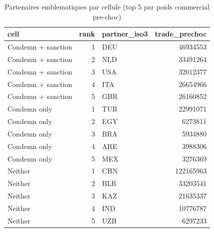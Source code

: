\begin{table}

\caption{Partenaires emblematiques par cellule (top 5 par poids commercial pre-choc)}
\centering
\begin{tabular}[t]{lrlr}
\toprule
cell & rank & partner\_iso3 & trade\_prechoc\\
\midrule
Condemn + sanction & 1 & DEU & 46934553\\
Condemn + sanction & 2 & NLD & 33491264\\
Condemn + sanction & 3 & USA & 32012377\\
Condemn + sanction & 4 & ITA & 26654966\\
Condemn + sanction & 5 & GBR & 26160852\\
Condemn only & 1 & TUR & 22991071\\
Condemn only & 2 & EGY & 6273811\\
Condemn only & 3 & BRA & 5934880\\
Condemn only & 4 & ARE & 3988306\\
Condemn only & 5 & MEX & 3276369\\
Neither & 1 & CHN & 122165963\\
Neither & 2 & BLR & 33203541\\
Neither & 3 & KAZ & 21635337\\
Neither & 4 & IND & 10776787\\
Neither & 5 & UZB & 6297233\\
\bottomrule
\end{tabular}
\end{table}
